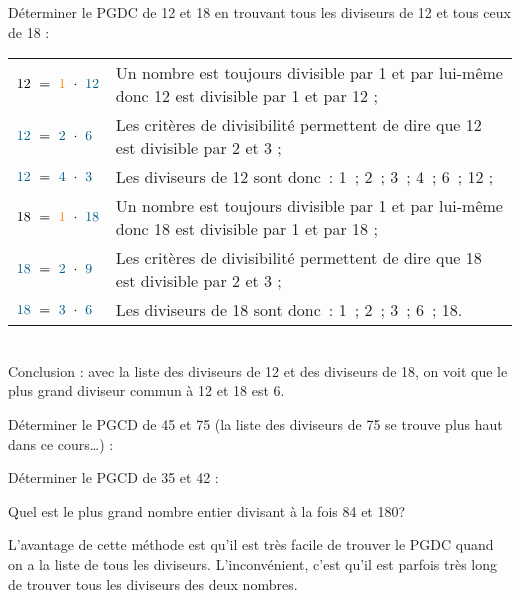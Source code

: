  \begin{methode*1}


\begin{exemple*1}
Déterminer le PGDC de 12 et 18 en trouvant tous les diviseurs de 12 et tous ceux de 18 : \\[1em]
\begin{tabularx}{\textwidth}{l|X}
 $12 = \textcolor{J1}{1} \cdot \textcolor{A1}{12}$ & Un nombre est toujours divisible par 1 et par lui-même donc 12 est divisible par 1 et par 12 ; \\ 
 $\textcolor{A1}{12 }= \textcolor{A1}{2} \cdot \textcolor{A1}{6}$ & Les critères de divisibilité permettent de dire que 12 est divisible par 2 et 3 ; \\
 $\textcolor{A1}{12} = \textcolor{A1}{4} \cdot \textcolor{A1}{3}$ & Les diviseurs de 12 sont donc : 1 ; 2 ; 3 ; 4 ; 6 ; 12 ; \\
 $18 = \textcolor{J1}{1} \cdot \textcolor{A1}{18}$ & Un nombre est toujours divisible par 1 et par lui-même donc 18 est divisible par 1 et par 18 ; \\ 
 $\textcolor{A1}{18} = \textcolor{A1}{2} \cdot \textcolor{A1}{9}$ & Les critères de divisibilité permettent de dire que 18 est divisible par 2 et 3 ; \\
 $\textcolor{A1}{18} = \textcolor{A1}{3} \cdot \textcolor{A1}{6}$ & Les diviseurs de 18 sont donc : 1 ; 2 ; 3 ; 6 ; 18. \\
\end{tabularx} \\[1em]
Conclusion : avec la liste des diviseurs de 12 et des diviseurs de 18, on voit que le plus grand diviseur commun à 12 et 18 est 6. \\[-2em]
 \end{exemple*1}
 
 \exercice  
Déterminer le PGCD de 45 et 75 (la liste des diviseurs de 75 se trouve plus haut dans ce cours…) :



\exercice  
Déterminer le PGCD de 35 et 42 :


\exercice  
Quel est le plus grand nombre entier divisant à la fois 84 et 180?



 \end{methode*1}

 
 \begin{remarque}
L'avantage de cette méthode est qu'il est très facile de trouver le PGDC quand on a la liste de tous les diviseurs. L'inconvénient, c'est qu'il est parfois très long de trouver tous les diviseurs des deux nombres.
\end{remarque}


